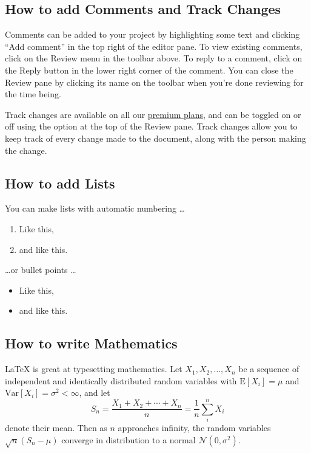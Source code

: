 \documentclass{article}
\begin{document}
      \subsection{How to add Comments and Track Changes}

      Comments can be added to your project by highlighting some text and
      clicking ``Add comment'' in the top right of the editor pane. To view existing
      comments, click on the Review menu in the toolbar above. To reply to a comment,
      click on the Reply button in the lower right corner of the comment. You can
      close the Review pane by clicking its name on the toolbar when you're done
      reviewing for the time being.

      Track changes are available on all our \href{https://www.overleaf.com/user/subscription/plans}{premium
      plans}, and can be toggled on or off using the option at the top of the
      Review pane. Track changes allow you to keep track of every change made to
      the document, along with the person making the change.

      \subsection{How to add Lists}

      You can make lists with automatic numbering \dots

      \begin{enumerate}
            \item Like this,

            \item and like this.
      \end{enumerate}
      \dots or bullet points \dots
      \begin{itemize}
            \item Like this,

            \item and like this.
      \end{itemize}

      \subsection{How to write Mathematics}

      \LaTeX{} is great at typesetting mathematics. Let
      $X_{1}, X_{2}, \ldots, X_{n}$ be a sequence of independent and identically
      distributed random variables with $\text{E}[X_{i}] = \mu$ and
      $\text{Var}[X_{i}] = \sigma^{2}< \infty$, and let
      \[
            S_{n}= \frac{X_{1}+ X_{2}+ \cdots + X_{n}}{n}= \frac{1}{n}\sum_{i}^{n}
            X_{i}
      \]
      denote their mean. Then as $n$ approaches infinity, the random variables $\sqrt{n}
      (S_{n}- \mu)$ converge in distribution to a normal $\mathcal{N}(0, \sigma^{2}
      )$.
\end{document}
